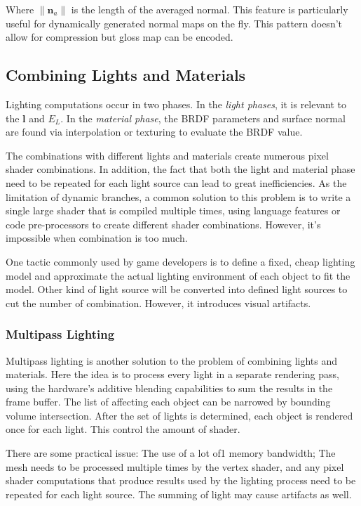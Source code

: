 \documentclass[10pt, a4paper]{article}
\begin{document}
            Where $\|\textbf{n}_a\|$ is the length of the averaged normal. This feature is particularly useful for dynamically generated normal maps on the fly. This pattern doesn't allow for compression but gloss map can be encoded. 
        
    \subsection{Combining Lights and Materials}
        Lighting computations occur in two phases. In the \emph{light phases}, it is relevant to the \textbf{l} and $E_L$. In the \emph{material phase}, the BRDF parameters and surface normal are found via interpolation or texturing to evaluate  the BRDF value.

        The combinations with different lights and materials create numerous pixel shader combinations. In addition, the fact that both the light and material phase need to be repeated for each light source  can lead to great inefficiencies. As the limitation of dynamic branches, a common solution to this problem is to write a single large shader that is compiled multiple times, using language features or code pre-processors to create different shader combinations. However, it's impossible when combination is too much. 

        One tactic commonly used by game developers is to define a fixed, cheap lighting model and approximate the actual lighting environment of each object to fit the model. Other kind of light source will be converted into defined light sources to cut the number of combination. However, it introduces visual artifacts. 

        \subsubsection{Multipass Lighting}
            Multipass lighting is another solution to the problem of combining lights and materials. Here the idea is to process every light in a separate rendering pass, using the hardware's additive blending capabilities to sum the results in the frame buffer. The list of affecting each object can be narrowed by bounding volume intersection. After the set of lights is determined, each object is rendered once for each light. This control the amount of shader. 

            There are some practical issue: The use of a lot of1 memory bandwidth; The mesh needs to be processed multiple times by the vertex shader, and any pixel shader computations that produce results used by the lighting process need to be repeated for each light source. The summing of light may cause artifacts as well. 
        
\end{document}
